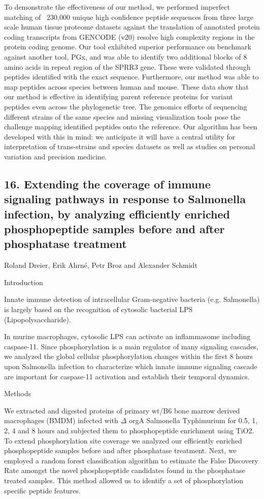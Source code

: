 To demonstrate the effectiveness of our method, we performed imperfect matching of ~230,000 unique high confidence peptide sequences from three large scale human tissue proteome datasets against the translation of annotated protein coding transcripts from GENCODE (v20) resolve high complexity regions in the protein coding genome. Our tool exhibited superior performance on benchmark against another tool, PGx, and was able to identify two additional blocks of 8 amino acids in repeat region of the SPRR3 gene. These were validated through peptides identified with the exact sequence. Furthermore, our method was able to map peptides across species between human and mouse. These data show that our method is effective in identifying parent reference proteins for variant peptides even across the phylogenetic tree. The genomics efforts of sequencing different strains of the same species and missing visualization tools pose the challenge mapping identified peptides onto the reference. Our algorithm has been developed with this in mind: we anticipate it will have a central utility for interpretation of trans-strains and species datasets as well as studies on personal variation and precision medicine.

\subsection*{\color{eubicRed} 16. Extending the coverage of immune signaling pathways in response to Salmonella infection, by analyzing efficiently enriched phosphopeptide samples before and after phosphatase treatment}
{\color{eubicGray}Roland Dreier, Erik Ahrné, Petr Broz and Alexander Schmidt}

Introduction

Innate immune detection of intracellular Gram-negative bacteria (e.g. Salmonella) is largely based on the recognition of cytosolic bacterial LPS (Lipopolysaccharide).

In murine macrophages, cytosolic LPS can activate an inflammasome including caspase-11. Since phosphorylation is a main regulator of many signaling cascades, we analyzed the global cellular phosphorylation changes within the first 8 hours upon Salmonella infection to characterize which innate immune signaling cascade are important for caspase-11 activation and establish their temporal dynamics.


Methods

We extracted and digested proteins of primary wt/B6 bone marrow derived macrophages (BMDM) infected with $\Delta$ orgA Salmonella Typhimurium for 0.5, 1, 2, 4 and 8 hours and subjected them to phosphopeptide enrichment using TiO2. To extend phosphorylation site coverage we analyzed our efficiently enriched phosphopeptide samples before and after phosphatase treatment. Next, we employed a random forest classification algorithm to estimate the False Discovery Rate amongst the novel phosphopeptide candidates found in the phosphatase treated samples. This method allowed us to identify a set of phosphorylation specific peptide features.

